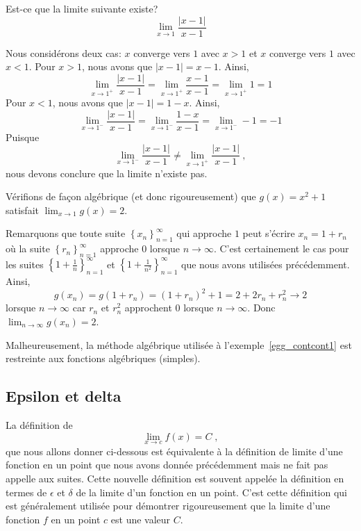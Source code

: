 {\begin{egg}
Est-ce que la limite suivante existe?
\[
\lim_{x\to 1} \frac{|x-1|}{x-1}
\]

Nous considérons deux cas: $x$ converge vers $1$ avec $x>1$ et $x$
converge vers $1$ avec $x<1$.  Pour $x>1$, nous avons que $|x-1| = x-1$.
Ainsi,
\[
\lim_{x\to 1^+} \frac{|x-1|}{x-1} = \lim_{x\to 1^+} \frac{x-1}{x-1}
= \lim_{x\to 1^+} 1 = 1
\]
Pour $x<1$, nous avons que $|x-1| = 1 - x$.  Ainsi,
\[
\lim_{x\to 1^-} \frac{|x-1|}{x-1} = \lim_{x\to 1^-} \frac{1-x}{x-1}
= \lim_{x\to 1^-} -1 = -1
\]
Puisque
\[
\lim_{x\to 1^-} \frac{|x-1|}{x-1} \neq \lim_{x\to 1^+}
\frac{|x-1|}{x-1} \ ,
\]
nous devons conclure que la limite n'existe pas.
\end{egg}

\begin{egg}
Vérifions de façon algébrique (et donc rigoureusement) que
$g(x) = x^2 +1$ satisfait $\displaystyle \lim_{x\rightarrow 1} g(x) = 2$.

Remarquons que toute suite
$\displaystyle \left\{x_n\right\}_{n=1}^\infty$
qui approche $1$ peut s'écrire $x_n = 1 + r_n$ où la suite
$\displaystyle \left\{r_n\right\}_{n=1}^\infty$ approche $0$ lorsque
$n \to \infty$.  C'est certainement le cas pour les
suites $\displaystyle \left\{ 1 + \frac{1}{n} \right\}_{n=1}^\infty$
et $\displaystyle \left\{1+\frac{1}{n^2} \right\}_{n=1}^\infty$
que nous avons utilisées précédemment.  Ainsi,
\[
g(x_n) = g(1+r_n) = (1+r_n)^2 + 1 = 2 + 2r_n + r_n^2 \to 2
\]
lorsque $n \to \infty$ car $r_n$ et $r_n^2$ approchent $0$ lorsque
$n \to \infty$.  Donc $\displaystyle \lim_{n\rightarrow \infty} g(x_n) = 2$.
\label{egg_contcont1}
\end{egg}

Malheureusement, la méthode algébrique utilisée à
l'exemple~\ref{egg_contcont1} est restreinte aux fonctions algébriques
(simples).

\subsection{Epsilon et delta \theory}

La définition de
\[
\lim_{x\rightarrow c} f(x) = C \; ,
\]
que nous allons donner ci-dessous est équivalente à la définition de
limite d'une fonction en un point que nous avons donnée précédemment mais
ne fait pas appelle aux suites.  Cette nouvelle définition est souvent
appelée la définition en termes de $\epsilon$ et $\delta$ de la limite
d'un fonction en un point.  C'est cette définition qui est généralement
utilisée pour démontrer rigoureusement que la limite d'une fonction
$f$ en un point $c$ est une valeur $C$.

}
